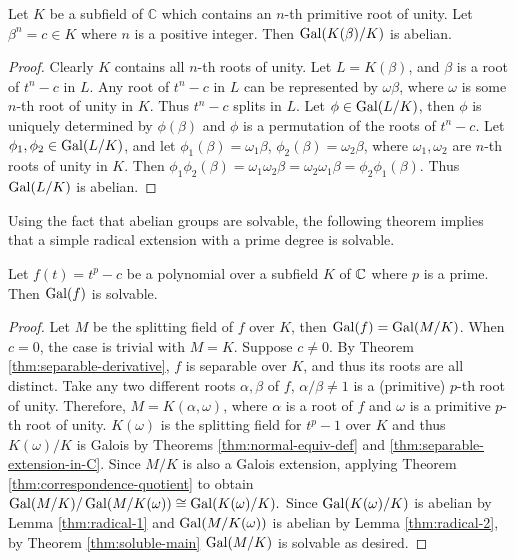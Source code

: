 \begin{lemma} \label{thm:radical-2}
	Let $K$ be a subfield of $\mathbb{C}$ which contains an $n$-th primitive root of unity. Let $\beta^n = c \in K $ where $n$ is a positive integer. Then $\operatorname{Gal}(K(\beta) / K)$ is abelian.
\end{lemma}

\begin{proof}
	Clearly $K$ contains all $n$-th roots of unity. Let $L = K(\beta)$, and $\beta$ is a root of $t^n-c$ in $L$. Any root of $t^n-c$ in $L$ can be represented by $\omega \beta$, where $\omega$ is some $n$-th root of unity in $K$. Thus $t^n - c$ splits in $L$.  Let $\phi \in \operatorname{Gal}(L / K)$, then $\phi$ is uniquely determined by $\phi(\beta)$ and $\phi$ is a permutation of the roots of $t^n - c$. Let $\phi_1, \phi_2 \in \operatorname{Gal}(L / K)$, and let $\phi_1(\beta) = \omega_1\beta$, $\phi_2(\beta) = \omega_2\beta$, where $\omega_1, \omega_2$ are $n$-th roots of unity in $K$. Then
	$
	\phi_1 \phi_2(\beta)=\omega_1 \omega_2 \beta=\omega_2 \omega_1  \beta=\phi_2 \phi_1(\beta).
	$
	Thus $\operatorname{Gal}(L / K)$ is abelian.
\end{proof}
Using the fact that abelian groups are solvable, the following theorem implies that a simple radical extension with a prime degree is solvable. 
\begin{theorem} \label{thm:radical-simple-solvable}
	Let $f(t) = t^p - c$ be a polynomial over a subfield $K$ of $\mathbb C$ where $p$ is a prime. Then $\operatorname{Gal}(f)$ is solvable. 
\end{theorem}
\begin{proof}
	Let $M$ be the splitting field of $f$ over $K$, then $\operatorname{Gal}(f) = \operatorname{Gal}(M / K)$. 
	When $c = 0$, the case is trivial with $M = K$. Suppose $c \neq 0$. By Theorem \ref{thm:separable-derivative}, $f$ is separable over $K$, and thus its roots are all distinct. Take any two different roots $\alpha, \beta$ of $f$,  $\alpha / \beta \neq 1$ is a (primitive) $p$-th root of unity. Therefore, $M = K(\alpha, \omega)$, where $\alpha$ is a root of $f$ and $\omega$ is a primitive $p$-th root of unity. $K(\omega)$ is the splitting field for $t^p - 1$ over $K$ and thus $K(\omega) / K$ is Galois by Theorems \ref{thm:normal-equiv-def} and \ref{thm:separable-extension-in-C}.  Since $M / K$ is also a Galois extension, applying Theorem \ref{thm:correspondence-quotient} to obtain $\operatorname{Gal}(M / K) / \operatorname{Gal}(M / K(\omega)) \cong \operatorname{Gal}(K(\omega) / K). $
	Since $\operatorname{Gal}(K(\omega)/K)$ is abelian by Lemma \ref{thm:radical-1} and $\operatorname{Gal}(M / K(\omega))$ is abelian by Lemma \ref{thm:radical-2}, by Theorem \ref{thm:soluble-main} $\operatorname{Gal}(M/K)$ is solvable as desired. 
\end{proof}

